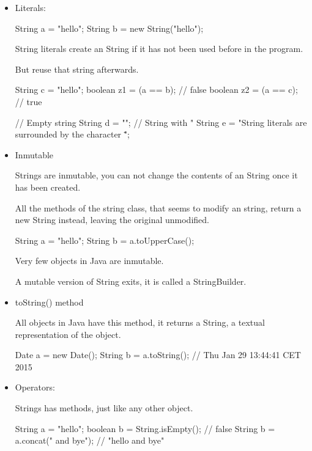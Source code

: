 \documentclass[a4paper, 9pt]{extarticle}
\begin{document}
\begin{itemize}

  \item{Literals}:

\begin{blackboard}
String a = "hello";
String b = new String("hello");
\end{blackboard}

  String literals create an String if it has not been used before in the program.

  But reuse that string afterwards.

\begin{blackboard}
String c = "hello";
boolean z1 = (a == b); // false
boolean z2 = (a == c); // true

// Empty string
String d = "";
// String with "
String e = "String literals are surrounded by the character \"";
\end{blackboard}

\item{Inmutable}

  Strings are inmutable, you can not change the contents of an String once it
  has been created.

  All the methods of the string class, that seems to modify an string, return a
  new String instead, leaving the original unmodified.

\begin{blackboard}
String a = "hello";
String b = a.toUpperCase();
\end{blackboard}

  Very few objects in Java are inmutable.

  A mutable version of String exits, it is called a StringBuilder.

\item{toString() method}

  All objects in Java have this method, it returns a String, a textual
  representation of the object.

\begin{blackboard}
Date a = new Date();
String b = a.toString(); // Thu Jan 29 13:44:41 CET 2015
\end{blackboard}

\item{Operators}:

    Strings has methods, just like any other object.

\begin{blackboard}
String a = "hello";
boolean b = String.isEmpty(); // false
String b = a.concat(" and bye"); // "hello and bye"
\end{blackboard}


\end{itemize}
\end{document}
